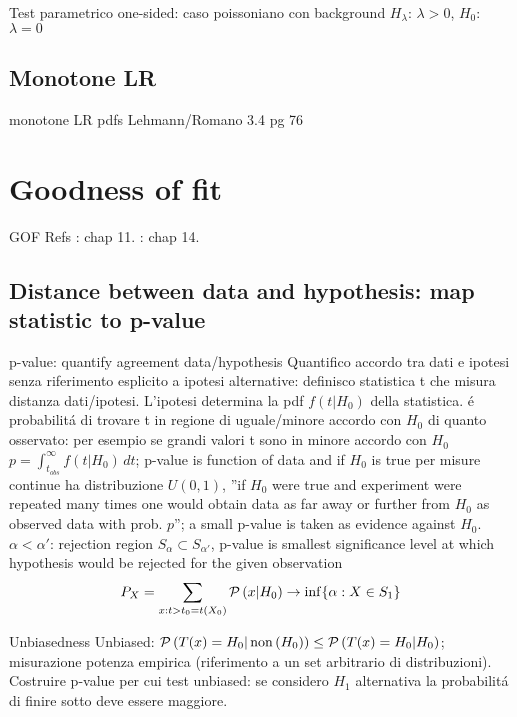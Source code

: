 \begin{frame}{Test parametrico one-sided: caso poissoniano con background}
$H_{\lambda}$: $\lambda>0$, $H_0$: $\lambda=0$
\end{frame}

\subsection{Monotone LR}

\begin{frame}{monotone LR pdfs}
Lehmann/Romano 3.4 pg 76
\end{frame}

\section{Goodness of fit}

\begin{wordonframe}{GOF Refs}
\cite{james2006statistical}: chap 11. \cite{lehmann2006testing}: chap 14.

\end{wordonframe}

\subsection{Distance between data and hypothesis: map statistic to p-value}

\begin{frame}{p-value: quantify agreement data/hypothesis}
Quantifico accordo tra dati e ipotesi senza riferimento esplicito a ipotesi alternative: definisco statistica t che misura distanza dati/ipotesi. L'ipotesi determina la pdf $f(t|H_0)$ della statistica.  \'e probabilit\'a di trovare t in regione di uguale/minore accordo con $H_0$ di quanto osservato: per esempio se grandi valori t sono in minore accordo con $H_0$ $p=\int_{t_{obs}}^{\infty}f(t|H_0)\,dt$; p-value is function of data and if $H_0$ is true per misure continue ha distribuzione $U(0,1)$,  ''if $H_0$ were true and experiment were repeated many times one would obtain data as far away or further from $H_0$ as observed data with prob. $p$''; a small p-value is taken as evidence against $H_0$.
$\alpha<\alpha'$: rejection region $S_{\alpha}\subset S_{\alpha'}$, p-value is smallest significance level at which hypothesis would be rejected for the given observation
\[P_X=\sum_{x:t>t_0=t(X_0)}\operatorname{\mathcal{P}}{(x|H_0)}\to\inf\{\alpha: X\in S_1\}\]
\begin{block}{Unbiasedness}
Unbiased: $\operatorname{\mathcal{P}}{(T(x)=H_0|\operatorname{non}{(H_0)})}\leq\operatorname{\mathcal{P}}{(T(x)=H_0|H_0)}$; misurazione potenza empirica (riferimento a un set arbitrario di distribuzioni).
Costruire p-value per cui test unbiased: se considero $H_1$ alternativa la probabilit\'a di finire sotto deve essere maggiore.
\end{block}
\end{frame}


